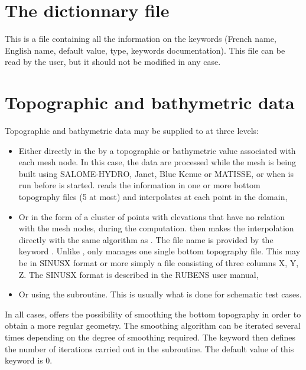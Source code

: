 \section{The dictionnary file}

This is a file containing all the information on the keywords (French name,
English name, default value, type, keywords documentation). This file can be
read by the user, but it should not be modified in any case.

\section{Topographic and bathymetric data}
\label{sec:topo}
Topographic and bathymetric data may be supplied to  at three
levels:

\begin{itemize}
\item Either directly in the  by a topographic
or bathymetric value associated with each mesh node.
In this case, the data are processed while the mesh is being built using
SALOME-HYDRO, Janet, Blue Kenue or MATISSE,
or when \stbtel is run before  is started.
\stbtel reads the information in one or more bottom topography files (5 at most)
and interpolates at each point in the domain,

\item Or in the form of a cluster of points with elevations that have
no relation with the mesh nodes, during the  computation.
 then makes the interpolation directly with the same algorithm as
\stbtel.
The file name is provided by the keyword .
Unlike \stbtel,  only manages one single bottom topography file.
This may be in SINUSX format or more simply a file consisting of three columns
X, Y, Z.
The SINUSX format is described in the RUBENS user manual,

\item Or using the  subroutine.
This is usually what is done for schematic test cases.
\end{itemize}

In all cases,  offers the possibility of smoothing the bottom
topography in order to obtain a more regular geometry.
The smoothing algorithm can be iterated several times depending on the degree of
smoothing required.
The keyword  then defines the number of
iterations carried out in the  subroutine.
The default value of this keyword is 0.

